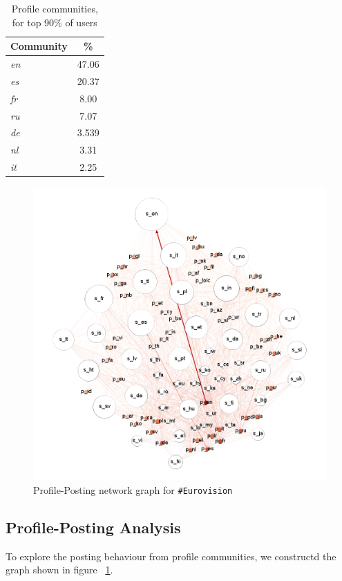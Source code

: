 \begin{table}[!htb]
\centering
\begin{tabular}{@{}lc}
\toprule
\textbf{Community} & \textbf{\%} \\ 
\midrule
{\emph{en}} & 47.06 \\
{\emph{es}} & 20.37 \\
{\emph{fr}} & 8.00 \\
{\emph{ru}} & 7.07 \\
{\emph{de}} & 3.539 \\
{\emph{nl}} & 3.31 \\
{\emph{it}} & 2.25 \\ 
\bottomrule
\end{tabular}
\caption{Profile communities, for top 90\% of users}
\label{tbl:profcomms}
\end{table}


\begin{figure}[htb]
\centering
\includegraphics[width=\columnwidth]{images/euro_pslang.png}
\caption{Profile-Posting network graph for {\texttt{\#Eurovision}}}
\label{fig:eurovisionpslang}
\end{figure}

\subsection{Profile-Posting Analysis}
To explore the posting behaviour from profile communities, we constructd the graph shown
in figure ~\ref{fig:eurovisionpslang}.

